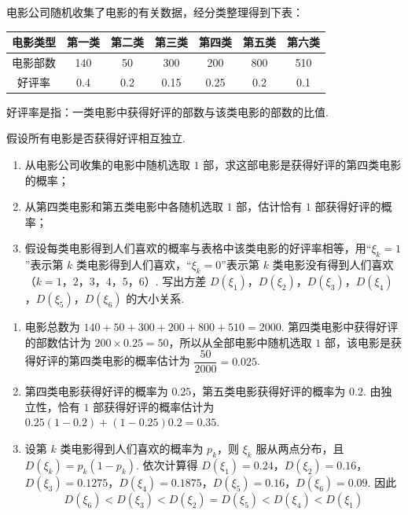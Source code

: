 \begin{problem}
电影公司随机收集了电影的有关数据，经分类整理得到下表：

\begin{center}
\begin{tabular}{c|cccccc}
\hline
电影类型 & 第一类 & 第二类 & 第三类 & 第四类 & 第五类 & 第六类 \\
\hline
电影部数 & 140 & 50 & 300 & 200 & 800 & 510 \\
好评率 & 0.4 & 0.2 & 0.15 & 0.25 & 0.2 & 0.1 \\
\hline
\end{tabular}
\end{center}

好评率是指：一类电影中获得好评的部数与该类电影的部数的比值.

假设所有电影是否获得好评相互独立.

\begin{enumerate}
    \item 从电影公司收集的电影中随机选取 \(1\) 部，求这部电影是获得好评的第四类电影的概率；
    \item 从第四类电影和第五类电影中各随机选取 \(1\) 部，估计恰有 \(1\) 部获得好评的概率；
    \item 假设每类电影得到人们喜欢的概率与表格中该类电影的好评率相等，用“\(\xi_k=1\)”表示第 \(k\) 类电影得到人们喜欢，“\(\xi_k=0\)”表示第 \(k\) 类电影没有得到人们喜欢（\(k=1\)，\(2\)，\(3\)，\(4\)，\(5\)，\(6\)）. 写出方差 \(D(\xi_1)\)，\(D(\xi_2)\)，\(D(\xi_3)\)，\(D(\xi_4)\)，\(D(\xi_5)\)，\(D(\xi_6)\) 的大小关系.
\end{enumerate}
\end{problem}

\begin{solution}
\begin{enumerate}
    \item 电影总数为 \(140+50+300+200+800+510=2000\). 第四类电影中获得好评的部数估计为 \(200\times0.25=50\)，所以从全部电影中随机选取 \(1\) 部，该电影是获得好评的第四类电影的概率估计为 \(\dfrac{50}{2000}=0.025\).
    \item 第四类电影获得好评的概率为 \(0.25\)，第五类电影获得好评的概率为 \(0.2\). 由独立性，恰有 \(1\) 部获得好评的概率估计为 \(0.25(1-0.2)+(1-0.25)0.2=0.35\).
    \item 设第 \(k\) 类电影得到人们喜欢的概率为 \(p_k\)，则 \(\xi_k\) 服从两点分布，且 \(D(\xi_k)=p_k(1-p_k)\). 依次计算得 \(D(\xi_1)=0.24\)，\(D(\xi_2)=0.16\)，\(D(\xi_3)=0.1275\)，\(D(\xi_4)=0.1875\)，\(D(\xi_5)=0.16\)，\(D(\xi_6)=0.09\).
    因此
    \[
    D(\xi_6)<D(\xi_3)<D(\xi_2)=D(\xi_5)<D(\xi_4)<D(\xi_1)
    \]
\end{enumerate}
\end{solution}

